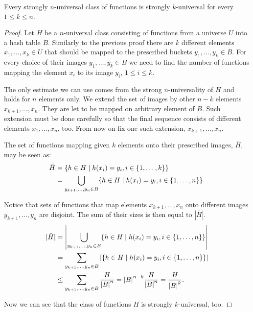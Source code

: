 \begin{remark}
\label{remark-n-to-k}
Every strongly $n$-universal class of functions is strongly $k$-universal for every $1 \leq k \leq n$.
\end{remark}
\begin{proof}
Let $H$ be a $n$-universal class consisting of functions from a universe $U$ into a hash table $B$. Similarly to the previous proof there are $k$ different elements $x_1, \dots, x_k \in U$ that should be mapped to the prescribed buckets $y_1, \dots, y_k \in B$. For every choice of their images $y_1, \dots, y_k \in B$ we need to find the number of functions mapping the element $x_i$ to its image $y_i$, $1 \leq i \leq k$. 

The only estimate we can use comes from the strong $n$-universality of $H$ and holds for $n$ elements only. We extend the set of images by other $n - k$ elements $x_{k + 1}, \dots, x_n$. They are let to be mapped on arbitrary element of $B$. Such extension must be done carefully so that the final sequence consists of different elements $x_1, \dots, x_n$, too. From now on fix one such extension, $x_{k + 1}, \dots, x_n$.

The set of functions mapping given $k$ elements onto their prescribed images, $\bar H$, may be seen as:
\[
\begin{split}
\bar{H}	& = \lbrace h \in H \mid h(x_i) = y_i, i \in \lbrace 1, \dots, k \rbrace \rbrace \\
	& = \displaystyle \bigcup_{y_{k+1}, \dots, y_n \in B} \lbrace h \in H \mid h(x_i) = y_i, i \in \lbrace 1, \dots, n \rbrace \rbrace \text{.}
\end{split}
\]

Notice that sets of functions that map elements $x_{k + 1}, \dots, x_n$ onto different images $y_{k + 1}, \dots, y_n$ are disjoint. The sum of their sizes is then equal to $|\bar H|$.
\[
\begin{split}
|\bar H|& = \left| \displaystyle \bigcup_{y_{k+1}, \dots, y_n \in B} \lbrace h \in H \mid h(x_i) = y_i, i \in \lbrace 1, \dots, n \rbrace \rbrace \right| \\
	& = \displaystyle \sum_{y_{k+1}, \dots, y_n \in B} \left| \lbrace h \in H \mid h(x_i) = y_i, i \in \lbrace 1, \dots, n \rbrace \rbrace \right| \\
	& \leq \displaystyle \sum_{y_{k+1}, \dots, y_n \in B} \frac{H}{{|B|}^{n}} = {|B|}^{n - k} \frac{H}{{|B|}^{n}} = \frac{H}{{|B|}^{k}} \text{.}
\end{split}
\]

Now we can see that the class of functions $H$ is strongly $k$-universal, too.
\end{proof}

